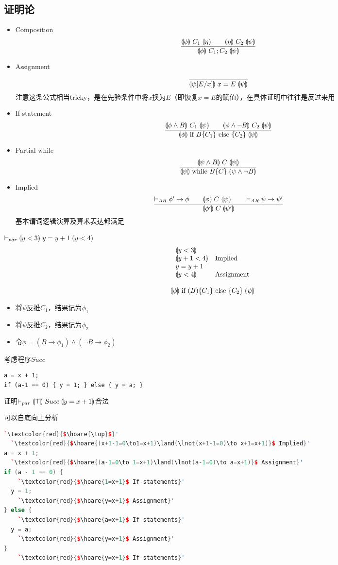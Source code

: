 \subsection{证明论}
\begin{itemize}
	\item Composition
	\[\frac{\llparenthesis \phi\rrparenthesis\;C_1\;\llparenthesis \eta\rrparenthesis\qquad\llparenthesis \eta\rrparenthesis\;C_2\;\llparenthesis \psi\rrparenthesis}{\llparenthesis \phi\rrparenthesis\;C_1;C_2\;\llparenthesis \psi\rrparenthesis}\]
	\item Assignment
	\[\frac{}{\llparenthesis \psi[E/x]\rrparenthesis\;x=E\;\llparenthesis \psi\rrparenthesis}\]
	注意这条公式相当tricky，是在先验条件中将$x$换为$E$（即恢复$x=E$的赋值），在具体证明中往往是反过来用
	\item If-statement
	\[\frac{\llparenthesis \phi\land B\rrparenthesis\;C_1\;\llparenthesis \psi\rrparenthesis\qquad\llparenthesis \phi\land\lnot B\rrparenthesis\;C_2\;\llparenthesis \psi\rrparenthesis}{\llparenthesis \phi\rrparenthesis\;\text{if }B\{C_1\}\text{ else }\{C_2\}\;\llparenthesis \psi\rrparenthesis}\]
	\item Partial-while
	\[\frac{\llparenthesis \psi\land B\rrparenthesis\;C\;\llparenthesis \psi\rrparenthesis}{\llparenthesis \psi\rrparenthesis\;\text{while }B\{C\}\;\llparenthesis \psi\land\lnot B\rrparenthesis}\]
	\item Implied
	\[\frac{\vdash_{AR}\phi'\to\phi\qquad\llparenthesis \phi\rrparenthesis\;C\;\llparenthesis \psi\rrparenthesis\qquad\vdash_{AR}\psi\to\psi'}{\llparenthesis \phi'\rrparenthesis\;C\;\llparenthesis \psi'\rrparenthesis}\]
	基本谓词逻辑演算及算术表达都满足
\end{itemize}
\begin{example}
$\vdash_{par}\llparenthesis y<3\rrparenthesis\;y=y+1\;\llparenthesis y<4\rrparenthesis$
\[\begin{array}{ll}
\llparenthesis y<3\rrparenthesis &\\
\llparenthesis y+1 < 4\rrparenthesis & \text{Implied}\\
y = y+1 &\\
\llparenthesis y<4\rrparenthesis &\text{Assignment}
\end{array}\]
\end{example}

\[\llparenthesis \phi\rrparenthesis\;\text{if }(B)\{C_1\}\text{ else }\{C_2\}\;\llparenthesis \psi\rrparenthesis\]
\begin{itemize}
	\item 将$\psi$反推$C_1$，结果记为$\phi_1$
	\item 将$\psi$反推$C_2$，结果记为$\phi_2$
	\item 令$\phi=(B\to\phi_1)\land(\lnot B\to\phi_2)$
\end{itemize}
\begin{example}
考虑程序$Succ$
\begin{lstlisting}
a = x + 1;
if (a-1 == 0) { y = 1; } else { y = a; }
\end{lstlisting}
证明$\vdash_{par}\llparenthesis \top\rrparenthesis\;Succ\;\llparenthesis y=x+1\rrparenthesis$合法
\end{example}
\begin{analysis}
可以自底向上分析
\begin{lstlisting}[language=c++]
  `\textcolor{red}{$\hoare{\top}$}'
  `\textcolor{red}{$\hoare{(x+1-1=0\to1=x+1)\land(\lnot(x+1-1=0)\to x+1=x+1)}$ Implied}'
a = x + 1;
  `\textcolor{red}{$\hoare{(a-1=0\to 1=x+1)\land(\lnot(a-1=0)\to a=x+1)}$ Assignment}'
if (a - 1 == 0) {
    `\textcolor{red}{$\hoare{1=x+1}$ If-statements}'
  y = 1;
    `\textcolor{red}{$\hoare{y=x+1}$ Assignment}'
} else {
    `\textcolor{red}{$\hoare{a=x+1}$ If-statements}'
  y = a;
    `\textcolor{red}{$\hoare{y=x+1}$ Assignment}'
}
    `\textcolor{red}{$\hoare{y=x+1}$ If-statements}'
\end{lstlisting}
\end{analysis}

